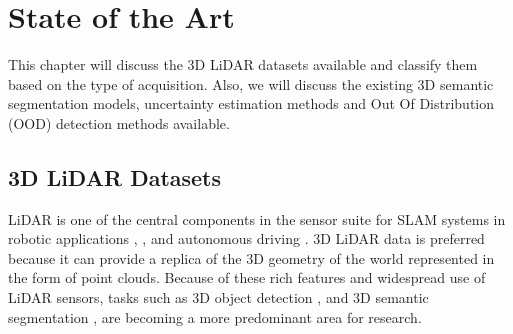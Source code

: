 

    \chapter{State of the Art}
    This chapter will discuss the 3D LiDAR datasets available and classify them based on the type of acquisition.
    Also, we will discuss the existing 3D semantic segmentation models, uncertainty estimation methods and Out Of Distribution (OOD) detection methods available.
    \section{3D LiDAR Datasets}
    LiDAR is one of the central components in the sensor suite for SLAM systems in robotic applications \cite{thrun2006stanley}, \cite{patz2008practical}, \cite{hess20162dSLAM} and autonomous driving \cite{li2016vehicle}.
    3D LiDAR data is preferred because it can provide a replica of the 3D geometry of the world represented in the form of point clouds.
    Because of these rich features and widespread use of LiDAR sensors, tasks such as 3D object detection \cite{zhou2018voxelnet}, \cite{PIXOR} and 3D semantic segmentation \cite{qi2017pointnet++}, \cite{3Dmininet} are becoming a more predominant area for research.
    
